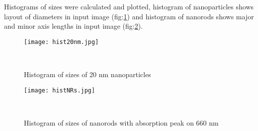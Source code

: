 Histograms of sizes were calculated and plotted, histogram of nanoparticles shows layout of diameters in input image (fig:\ref{fig:hist20nm}) and histogram of nanorods shows major and minor axis lengths in input image (fig:\ref{fig:histNRs}).

\begin{figure}[h!]
\begin{center}
    \texttt{[image: hist20nm.jpg]}
    \caption{Histogram of sizes of 20 nm nanoparticles}~\label{fig:hist20nm}
\end{center}
\end{figure}

\begin{figure}[h!]
\begin{center}
    \texttt{[image: histNRs.jpg]}
    \caption{Histogram of sizes of nanorods with absorption peak on 660 nm}~\label{fig:histNRs}
\end{center}
\end{figure}
